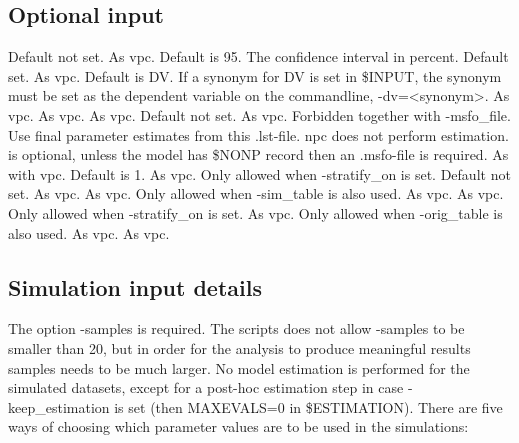 \subsection{Optional input}
\begin{optionlist}
	Default not set. As vpc. 
	\nextopt
	Default is 95. The confidence interval in percent. 
	\nextopt
	Default set. As vpc. 
	\nextopt
	Default is DV. If a synonym for DV is set in \$INPUT, the synonym must be set as the dependent variable on the commandline, -dv=<synonym>. 
	\nextopt
	As vpc. 
	\nextopt
	As vpc. 
	\nextopt
	As vpc. 
	\nextopt
	Default not set. As vpc. 
	\nextopt
	Forbidden together with -msfo\_file. Use final parameter estimates from this .lst-file. npc does not perform estimation. 
	\nextopt
	is optional, unless the model has \$NONP record then an .msfo-file is required. As with vpc. 
	\nextopt
	Default is 1. As vpc. 
	\nextopt
	Only allowed when -stratify\_on is set. 
	\nextopt
	Default not set. As vpc. 
	\nextopt
	As vpc.  
	\nextopt
	Only allowed when -sim\_table is also used. As vpc. 
	\nextopt
	As vpc.     
	\nextopt
	Only allowed when -stratify\_on is set. 
	\nextopt
	As vpc.    
	\nextopt
	Only allowed when -orig\_table is also used. As vpc.  
	\nextopt
	As vpc.   
	\nextopt
\end{optionlist}

\subsection{Simulation input details}
The option -samples is required. The scripts does not allow -samples to be smaller than 20, but in order for the analysis to produce meaningful results samples needs to be much larger. No model estimation is performed for the simulated datasets, except for a post-hoc estimation step in case \mbox{-keep\_estimation} is set (then MAXEVALS=0 in \$ESTIMATION). There are five ways of choosing which parameter values are to be used in the simulations: 

